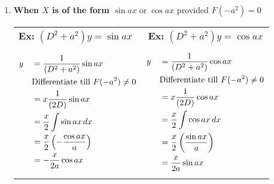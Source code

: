 \documentclass[a4paper, titlepage]{article}
\begin{document}
\begin{enumerate}[label=\textbf{\Roman*}]
            \item \textbf{When $X$ is of the form $\sin ax \; \text{or} \; \cos ax$}
            provided $F(-a^2) = 0$


            \begin{tabularx}{\linewidth}{X | c}
                \textbf{Ex: } $(D^2 + a^2)y = \sin ax$
                &
                \textbf{Ex: } $(D^2 + a^2)y = \cos ax$ \\
                \begin{minipage}[c]{0.5\linewidth}
                    {
                        \begin{align*}
                            &y &&= \dfrac{1}{(D^2 + a^2)} \sin ax \\
                            & \hfill &&\text{Differentiate till }F(-a^2) \neq 0 \\
                            &\hfill &&= x\dfrac{1}{(2D)} \sin ax \\
                            &\hfill &&= \dfrac{x}{2} \displaystyle\int\sin ax \, dx\\
                            &\hfill &&= \dfrac{x}{2} \left( -\dfrac{\cos ax}{a} \right) \\
                            &\hfill &&= -\dfrac{x}{2a}\cos ax
                        \end{align*}
                    }
                \end{minipage}
                &
                \begin{minipage}[c]{0.5\linewidth}
                    {
                        \begin{align*}
                            &y &&= \dfrac{1}{(D^2 + a^2)} \cos ax \\
                            & \hfill &&\hfill \text{Differentiate till }F(-a^2) \neq 0 \\
                            &\hfill &&= x\dfrac{1}{(2D)} \cos ax \\
                            &\hfill &&= \dfrac{x}{2} \displaystyle\int\cos ax \, dx\\
                            &\hfill &&= \dfrac{x}{2} \left( \dfrac{\sin ax}{a} \right) \\
                            &\hfill &&= \dfrac{x}{2a}\sin ax
                        \end{align*}
                    }
                \end{minipage}
            \end{tabularx}


\end{enumerate}
\end{document}
